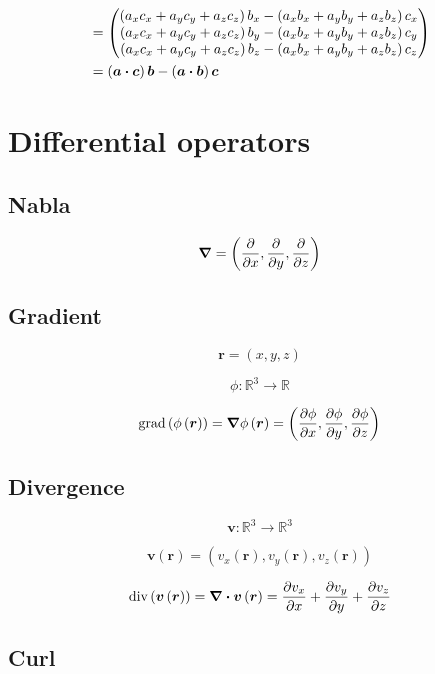 \documentclass{article}
\newcommand{\bb}[1]{\mathbb{#1}}
\renewcommand{\vec}[1]{\boldsymbol{#1}}
\begin{document}
\begin{align*}
    &= \begin{pmatrix} \left( a_x c_x + a_y c_y + a_z c_z \right) b_x - \left( a_x b_x + a_y b_y + a_z b_z \right) c_x \\ \left( a_x c_x + a_y c_y + a_z c_z \right) b_y - \left( a_x b_x + a_y b_y + a_z b_z \right) c_y \\ \left( a_x c_x + a_y c_y + a_z c_z \right) b_z - \left( a_x b_x + a_y b_y + a_z b_z \right) c_z \end{pmatrix} \\
    &= \left( \vec{a} \vdot \vec{c} \right) \vec{b} - \left( \vec{a} \vdot \vec{b} \right) \vec{c}
\end{align*}

\section{Differential operators}
\subsection{Nabla}

\[ \grad = \left( \pdv{}{x} , \pdv{}{y} , \pdv{z} \right) \]

\subsection{Gradient}

\[ \vec{r} = \left( x , y , z \right) \]

\[ \phi : \bb{R}^3 \rightarrow \bb{R} \]

\[ \text{grad}\left( \phi \left( \vec{r} \right) \right) = \grad{\phi \left( \vec{r} \right)} = \left( \pdv{\phi}{x} , \pdv{\phi}{y} , \pdv{\phi}{z} \right) \]

\subsection{Divergence}

\[ \vec{v} : \bb{R}^3 \rightarrow \bb{R}^3 \]

\[ \vec{v} \left( \vec{r} \right) = \left( v_x \left( \vec{r} \right) , v_y \left( \vec{r} \right) , v_z \left( \vec{r} \right) \right) \]

\[ \text{div}\left( \vec{v} \left( \vec{r} \right) \right) = \div{\vec{v} \left( \vec{r} \right)} = \pdv{v_x}{x} + \pdv{v_y}{y} + \pdv{v_z}{z} \]

\subsection{Curl}
\end{document}
